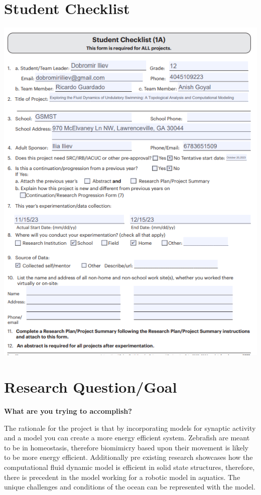 \documentclass{article}
\newcounter{research}
\begin{document}
\part{Student Checklist}
\includegraphics[width=\textwidth]{media/image41.png}

\newpage

\part{Research Question/Goal}

\textbf{What are you trying to accomplish?}

The rationale for the project is that by incorporating models for synaptic activity and a model you can create a more energy efficient system. Zebrafish are meant to be in homeostasis, therefore biomimicry based upon their movement is likely to be more energy efficient. Additionally pre existing research showcases how the computational fluid dynamic model is efficient in solid state structures, therefore, there is precedent in the model working for a robotic model in aquatics. The unique challenges and conditions of the ocean can be represented with  the model.
\end{document}

